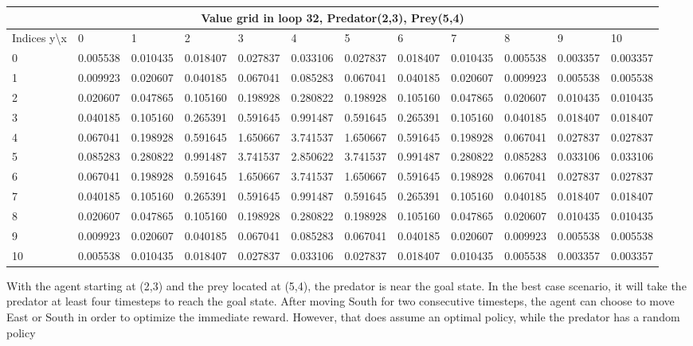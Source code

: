 \documentclass{article}
\begin{document}
\begin{center}
\scalebox{0.7}
	{
	\begin{tabular}{ |l | l | l | l | l | l | l | l | l | l | l | l|}
	\hline
	\multicolumn{12}{|c|}{Value grid in loop 32, Predator(2,3), Prey(5,4)}\\
	\hline
	Indices y\textbackslash x &0 & 1 & 2 & 3 & 4 & 5 & 6 & 7 & 8 & 9 & 10 \\ 

\hline
0 & 0.005538 & 0.010435 & 0.018407 & 0.027837 & 0.033106 & 0.027837 & 0.018407 & 0.010435 & 0.005538 & 0.003357 & 0.003357 \\
1 & 0.009923 & 0.020607 & 0.040185 & 0.067041 & 0.085283 & 0.067041 & 0.040185 & 0.020607 & 0.009923 & 0.005538 & 0.005538 \\
2 & 0.020607 & 0.047865 & 0.105160 & \cellcolor{green!40}0.198928 & 0.280822 & 0.198928 & 0.105160 & 0.047865 & 0.020607 & 0.010435 & 0.010435 \\
3 & 0.040185 & 0.105160 & 0.265391 & 0.591645 & 0.991487 & 0.591645 & 0.265391 & 0.105160 & 0.040185 & 0.018407 & 0.018407 \\
4 & 0.067041 & 0.198928 & 0.591645 & 1.650667 & 3.741537 & 1.650667 & 0.591645 & 0.198928 & 0.067041 & 0.027837 & 0.027837 \\
5 & 0.085283 & 0.280822 & 0.991487 & 3.741537 & \cellcolor{red!40}2.850622 & 3.741537 & 0.991487 & 0.280822 & 0.085283 & 0.033106 & 0.033106 \\
6 & 0.067041 & 0.198928 & 0.591645 & 1.650667 & 3.741537 & 1.650667 & 0.591645 & 0.198928 & 0.067041 & 0.027837 & 0.027837 \\
7 & 0.040185 & 0.105160 & 0.265391 & 0.591645 & 0.991487 & 0.591645 & 0.265391 & 0.105160 & 0.040185 & 0.018407 & 0.018407 \\
8 & 0.020607 & 0.047865 & 0.105160 & 0.198928 & 0.280822 & 0.198928 & 0.105160 & 0.047865 & 0.020607 & 0.010435 & 0.010435 \\
9 & 0.009923 & 0.020607 & 0.040185 & 0.067041 & 0.085283 & 0.067041 & 0.040185 & 0.020607 & 0.009923 & 0.005538 & 0.005538 \\
10 & 0.005538 & 0.010435 & 0.018407 & 0.027837 & 0.033106 & 0.027837 & 0.018407 & 0.010435 & 0.005538 & 0.003357 & 0.003357 \\
\hline
	\end{tabular}
	}
\end{center}

With the agent starting at (2,3) and the prey located at (5,4), the predator is near the goal state. In the best case scenario, it will take the predator at least four timesteps to reach the goal state. After moving South for two consecutive timesteps, the agent can choose to move East or South in order to optimize the immediate reward. However, that does assume an optimal policy, while the predator has a random policy %
\end{document}
